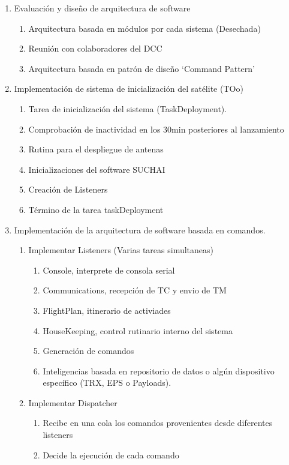 \documentclass{article}
\begin{document}
\begin{enumerate}
\begin{enumerate}
\item Evaluación y diseño de arquitectura de software

\begin{enumerate}
\item Arquitectura basada en módulos por cada sistema (Desechada)
\item Reunión con colaboradores del DCC
\item Arquitectura basada en patrón de diseño ‘Command Pattern’
\end{enumerate}
\item Implementación de sistema de inicialización del satélite (TOo)

\begin{enumerate}
\item Tarea de inicialización del sistema (TaskDeployment).
\item Comprobación de inactividad en los 30min posteriores al
lanzamiento
\item Rutina para el despliegue de antenas
\item Inicializaciones del software SUCHAI
\item Creación de Listeners
\item Término de la tarea taskDeployment
\end{enumerate}
\item Implementación de la arquitectura de software basada en comandos.

\begin{enumerate}
\item Implementar Listeners (Varias tareas simultaneas)

\begin{enumerate}
\item Console, interprete de consola serial
\item Communications, recepción de TC y envio de TM
\item FlightPlan, itinerario de activiades
\item HouseKeeping, control rutinario interno del sistema
\item Generación de comandos
\item Inteligencias basada en repositorio de datos o algún dispositivo
específico (TRX, EPS o Payloads). 
\end{enumerate}
\item Implementar Dispatcher

\begin{enumerate}
\item Recibe en una cola los comandos provenientes desde diferentes
listeners
\item Decide la ejecución de cada comando


\end{enumerate}
\end{enumerate}
\end{enumerate}
\end{enumerate}
\end{document}
